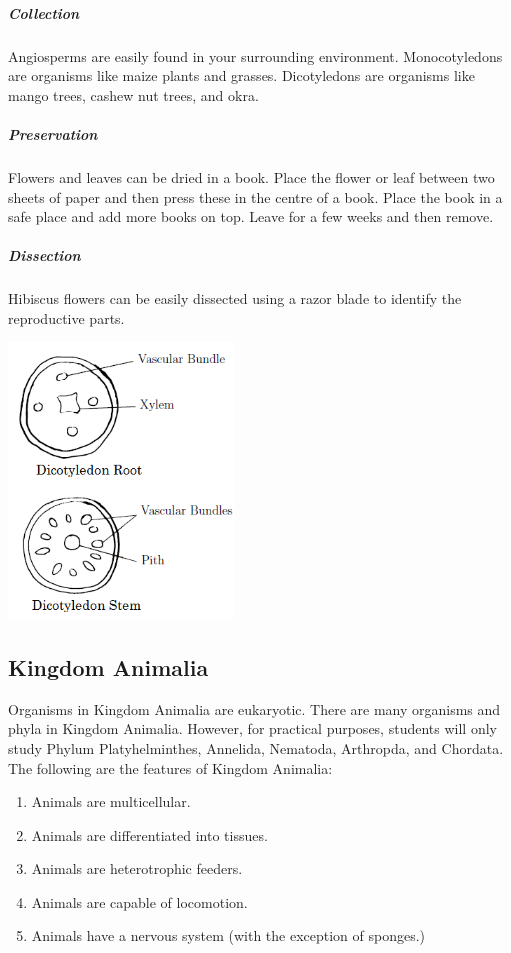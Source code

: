 \begin{multicols}{2}
\subparagraph{Collection}
Angiosperms are easily found in your surrounding environment. Monocotyledons are organisms like maize plants and grasses. Dicotyledons are organisms like mango trees, cashew nut trees, and okra.

\subparagraph{Preservation} 
Flowers and leaves can be dried in a book. Place the flower or leaf between two sheets of paper and then press these in the centre of a book. Place the book in a safe place and add more books on top. Leave for a few weeks and then remove.

\subparagraph{Dissection}
Hibiscus flowers can be easily dissected using a razor blade to identify the reproductive parts.

\begin{center}
\includegraphics[width=0.45\textwidth]{./img/dicotyledon.png}
\end{center}

\end{multicols}

\setcounter{secnumdepth}{3}

\pagebreak

\subsection{Kingdom Animalia} 
Organisms in Kingdom Animalia are eukaryotic. There are many organisms and phyla in Kingdom Animalia. However, for practical purposes, students will only study Phylum Platyhelminthes, Annelida, Nematoda, Arthropda, and Chordata.\\
The following are the features of Kingdom Animalia:
\begin{enumerate}
\item{Animals are multicellular.}
\item{Animals are differentiated into tissues.}
\item{Animals are heterotrophic feeders.}
\item{Animals are capable of locomotion.}
\item{Animals have a nervous system (with the exception of sponges.)}
\end{enumerate}



